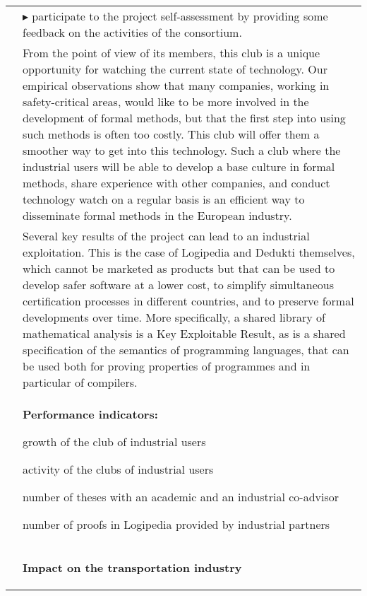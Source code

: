 \begin{longtable}{|p{}|p{}|}
\\
&
$\blacktriangleright$ participate to the project self-assessment by providing
some feedback on the activities of the consortium.\\
&
\hspace{0.4cm}
From the point of view of its members, this club is a unique
opportunity for watching the current state of technology. Our empirical observations show that
many companies, working in safety-critical areas, would like to be
more involved in the development of formal methods, but that the first
step into using such methods is often too costly. This club will offer
them a smoother way to get into this technology. Such a club
where the industrial users will be able to develop a base culture in
formal methods, share experience with other companies, and conduct
technology watch on a regular basis is an efficient way to disseminate
formal methods in the European industry.\\
&
\hspace{0.4cm}
Several key results of the project can lead to an industrial
exploitation. This is the case of Logipedia and Dedukti themselves,
which cannot be marketed as products but that can be used to develop safer
software at a lower cost, to simplify simultaneous certification
processes in different countries, and to preserve formal developments
over time. More specifically, a shared library of mathematical analysis is a Key
Exploitable Result, as is a shared specification of the semantics of
programming languages, that can be used both for proving properties of
programmes and in particular of compilers.\\
&\colorbox{color3}{\bf Performance indicators:}
\begin{compactitem}
  \item growth of the club of industrial users
  \item activity of the clubs of industrial users
  \item number of theses with an academic and an industrial co-advisor
  \item number of proofs in Logipedia provided by industrial partners
\end{compactitem}
\\
&
\definecolor{shadecolor}{named}{color2}
\begin{shaded}
{\bf\large Impact on the transportation industry}


\end{shaded}
\end{longtable}
